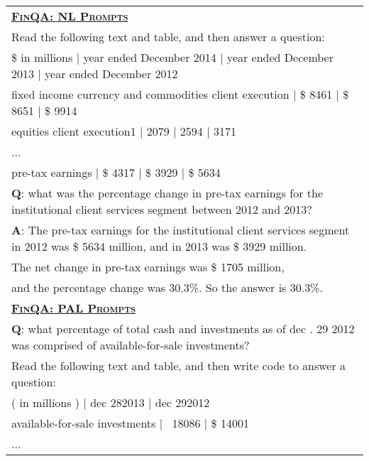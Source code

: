 \begin{table}[htbp]
\centering
\begin{tabular}{p{}}
\toprule
\underline{\textbf{\textsc{FinQA: NL Prompts}}} \\
Read the following text and table, and then answer a question:\\
\$ in millions | year ended December 2014 | year ended December 2013 | year ended December 2012 \\
fixed income currency and commodities client execution | \$ 8461 | \$ 8651 | \$ 9914 \\
equities client execution1 | 2079 | 2594 | 3171 \\
... \\
pre-tax earnings | \$ 4317 | \$ 3929 | \$ 5634 \\
\textbf{Q}: what was the percentage change in pre-tax earnings for the institutional client services segment between 2012 and 2013? \\
        \textbf{A}: The pre-tax earnings for the institutional client services segment in 2012 was \$ 5634 million, and in 2013 was \$ 3929 million.\\
        The net change in pre-tax earnings was \$ 1705 million, \\
        and the percentage change was 30.3\%. So the answer is 30.3\%. \\
        \midrule
        \underline{\textbf{\textsc{FinQA: PAL Prompts}}} \\
\textbf{Q}: what percentage of total cash and investments as of dec . 29 2012 was comprised of available-for-sale investments? \\
Read the following text and table, and then write code to answer a question: \\
( in millions ) | dec 282013 | dec 292012 \\
available-for-sale investments | \ 18086 | \$ 14001 \\
... \\

\end{tabular}
\end{table}
